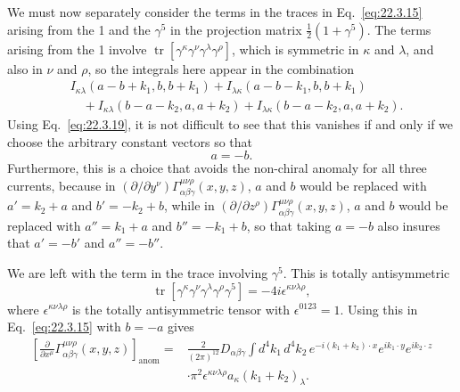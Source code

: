 We must now separately consider the terms in the traces in
Eq.~\eqref{eq:22.3.15} arising from the 1 and the $\gamma^5$ in the
projection matrix $\tfrac12(1+\gamma^5)$. The terms arising from the 1
involve $\operatorname{tr}[\gamma^\kappa\gamma^\nu
\gamma^\lambda\gamma^\rho]$, which is symmetric in $\kappa$ and $\lambda$,
and also in $\nu$ and $\rho$, so the integrals here appear in the
combination
\[
 \begin{aligned}
 &I_{\kappa\lambda}(a-b+k_1,b,b+k_1)
 +I_{\lambda\kappa}(a-b-k_1,b,b+k_1)
 \\
 &\quad
 +I_{\kappa\lambda}(b-a-k_2,a,a+k_2)
 +I_{\lambda\kappa}(b-a-k_2,a,a+k_2).
 \end{aligned}
\]
Using Eq.~\eqref{eq:22.3.19}, it is not difficult to see that this vanishes
if and only if we choose the arbitrary constant vectors so that
\begin{equation}
 a=-b.
 \tag{22.3.20}\label{eq:22.3.20}
\end{equation}
Furthermore, this is a choice that avoids the non-chiral anomaly for all
three currents, because in
$(\partial/\partial y^\nu)\Gamma_{\alpha\beta\gamma}^{\mu\nu\rho}(x,y,z)$,
$a$ and $b$ would be replaced with $a'=k_2+a$ and $b'=-k_2+b$, while in
$(\partial/\partial z^\rho)\Gamma_{\alpha\beta\gamma}^{\mu\nu\rho}(x,y,z)$,
$a$ and $b$ would be replaced with $a''=k_1+a$ and $b''=-k_1+b$, so that
taking $a=-b$ also insures that $a'=-b'$ and $a''=-b''$.

We are left with the term in the trace involving $\gamma^5$. This is
totally antisymmetric
\begin{equation}
 \operatorname{tr}
 \left[\gamma^\kappa\gamma^\nu\gamma^\lambda\gamma^\rho\gamma^5\right]
 =-4i\epsilon^{\kappa\nu\lambda\rho},
 \tag{22.3.21}\label{eq:22.3.21}
\end{equation}
where $\epsilon^{\kappa\nu\lambda\rho}$ is the totally antisymmetric tensor
with $\epsilon^{0123}=1$. Using this in Eq.~\eqref{eq:22.3.15} with $b=-a$
gives
\begin{equation}
 \begin{aligned}
 \left[
  \frac{\partial}{\partial x^\mu}
  \Gamma_{\alpha\beta\gamma}^{\mu\nu\rho}(x,y,z)
 \right]_{\mathrm{anom}}
 ={}&\frac{2}{(2\pi)^{12}}D_{\alpha\beta\gamma}
 \int d^4k_1\,d^4k_2\,
 e^{-i(k_1+k_2)\cdot x}e^{ik_1\cdot y}e^{ik_2\cdot z}
 \\
 &\cdot\pi^2\epsilon^{\kappa\nu\lambda\rho}
 a_\kappa(k_1+k_2)_\lambda.
 \end{aligned}
 \tag{22.3.22}\label{eq:22.3.22}
\end{equation}

